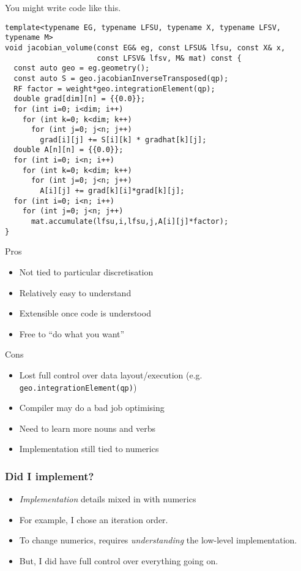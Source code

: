 \documentclass[presentation]{beamer}
\begin{document}
\begin{frame}[fragile]
  You might write code like this.

\begin{verbatim}
template<typename EG, typename LFSU, typename X, typename LFSV, typename M>
void jacobian_volume(const EG& eg, const LFSU& lfsu, const X& x, 
                     const LFSV& lfsv, M& mat) const {
  const auto geo = eg.geometry();
  const auto S = geo.jacobianInverseTransposed(qp);
  RF factor = weight*geo.integrationElement(qp);
  double grad[dim][n] = {{0.0}};
  for (int i=0; i<dim; i++)
    for (int k=0; k<dim; k++)
      for (int j=0; j<n; j++)
        grad[i][j] += S[i][k] * gradhat[k][j];
  double A[n][n] = {{0.0}};
  for (int i=0; i<n; i++)
    for (int k=0; k<dim; k++)
      for (int j=0; j<n; j++)
        A[i][j] += grad[k][i]*grad[k][j];
  for (int i=0; i<n; i++)
    for (int j=0; j<n; j++)
      mat.accumulate(lfsu,i,lfsu,j,A[i][j]*factor);
}
\end{verbatim}
\end{frame}

\begin{frame}
  \begin{block}{Pros}
    \begin{itemize}
    \item Not tied to particular discretisation
    \item Relatively easy to understand
    \item Extensible once code is understood
    \item Free to ``do what you want''
    \end{itemize}
  \end{block}
  \begin{block}{Cons}
    \begin{itemize}
    \item Lost full control over data layout/execution (e.g.
      \texttt{geo.integrationElement(qp)})
    \item Compiler may do a bad job optimising
    \item Need to learn more nouns and verbs
    \item Implementation still tied to numerics
    \end{itemize}
  \end{block}
\end{frame}

\begin{frame}
  \frametitle{Did I implement?}
  \begin{itemize}
  \item \emph{Implementation} details mixed in with numerics
  \item For example, I chose an iteration order.
  \item To change numerics, requires \emph{understanding} the
    low-level implementation.
  \item But, I did have full control over everything going on.
  \end{itemize}
\end{frame}
\end{document}
